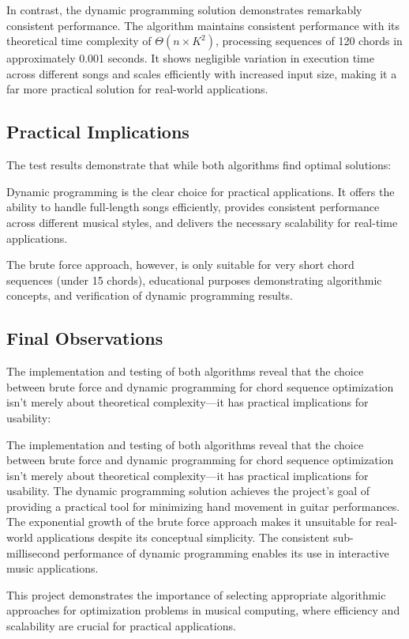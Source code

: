 \documentclass[conference]{IEEEtran}
\begin{document}
In contrast, the dynamic programming solution demonstrates remarkably consistent performance. The algorithm maintains consistent performance with its theoretical time complexity of \(\Theta(n \times K^2)\), processing sequences of 120 chords in approximately 0.001 seconds. It shows negligible variation in execution time across different songs and scales efficiently with increased input size, making it a far more practical solution for real-world applications.

\subsection{Practical Implications}
The test results demonstrate that while both algorithms find optimal solutions:

Dynamic programming is the clear choice for practical applications. It offers the ability to handle full-length songs efficiently, provides consistent performance across different musical styles, and delivers the necessary scalability for real-time applications.

The brute force approach, however, is only suitable for very short chord sequences (under 15 chords), educational purposes demonstrating algorithmic concepts, and verification of dynamic programming results.

\subsection{Final Observations}
The implementation and testing of both algorithms reveal that the choice between brute force and dynamic programming for chord sequence optimization isn't merely about theoretical complexity—it has practical implications for usability:

The implementation and testing of both algorithms reveal that the choice between brute force and dynamic programming for chord sequence optimization isn't merely about theoretical complexity—it has practical implications for usability. The dynamic programming solution achieves the project's goal of providing a practical tool for minimizing hand movement in guitar performances. The exponential growth of the brute force approach makes it unsuitable for real-world applications despite its conceptual simplicity. The consistent sub-millisecond performance of dynamic programming enables its use in interactive music applications.

This project demonstrates the importance of selecting appropriate algorithmic approaches for optimization problems in musical computing, where efficiency and scalability are crucial for practical applications.



\end{document}
